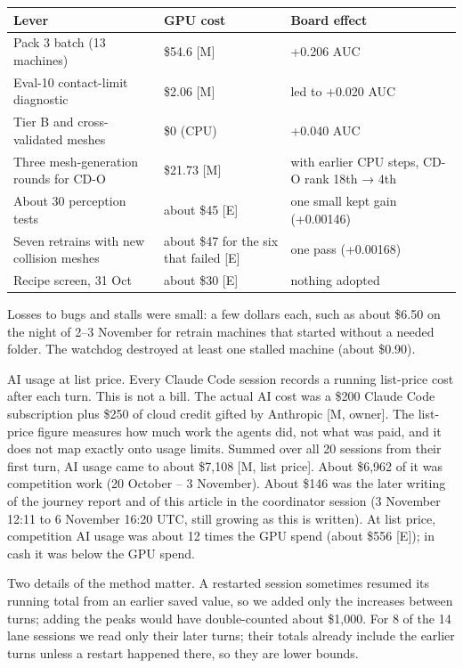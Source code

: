 \documentclass[11pt]{article}
\begin{document}
\begin{table}[tbp]
\centering\small
\begin{tabularx}{\linewidth}{>{\raggedright\arraybackslash}Xll}
\toprule
\textbf{Lever} & \textbf{GPU cost} & \textbf{Board effect} \\
\midrule
Pack 3 batch (13 machines) & \$54.6 {[}M{]} & +0.206 AUC \\
Eval-10 contact-limit diagnostic & \$2.06 {[}M{]} & led to +0.020 AUC \\
Tier B and cross-validated meshes & \$0 (CPU) & +0.040 AUC \\
Three mesh-generation rounds for CD-O & \$21.73 {[}M{]} & with earlier CPU steps, CD-O rank 18th → 4th \\
About 30 perception tests & about \$45 {[}E{]} & one small kept gain (+0.00146) \\
Seven retrains with new collision meshes & about \$47 for the six that failed {[}E{]} & one pass (+0.00168) \\
Recipe screen, 31 Oct & about \$30 {[}E{]} & nothing adopted \\
\bottomrule
\end{tabularx}
\end{table}
Losses to bugs and stalls were small: a few dollars each, such as about \$6.50 on the night of 2–3 November for retrain machines that started without a needed folder. The watchdog destroyed at least one stalled machine (about \$0.90).

AI usage at list price. Every Claude Code session records a running list-price cost after each turn. This is not a bill. The actual AI cost was a \$200 Claude Code subscription plus \$250 of cloud credit gifted by Anthropic {[}M, owner{]}. The list-price figure measures how much work the agents did, not what was paid, and it does not map exactly onto usage limits. Summed over all 20 sessions from their first turn, AI usage came to about \$7,108 {[}M, list price{]}. About \$6,962 of it was competition work (20 October – 3 November). About \$146 was the later writing of the journey report and of this article in the coordinator session (3 November 12:11 to 6 November 16:20 UTC, still growing as this is written). At list price, competition AI usage was about 12 times the GPU spend (about \$556 {[}E{]}); in cash it was below the GPU spend.

Two details of the method matter. A restarted session sometimes resumed its running total from an earlier saved value, so we added only the increases between turns; adding the peaks would have double-counted about \$1,000. For 8 of the 14 lane sessions we read only their later turns; their totals already include the earlier turns unless a restart happened there, so they are lower bounds.
\end{document}
